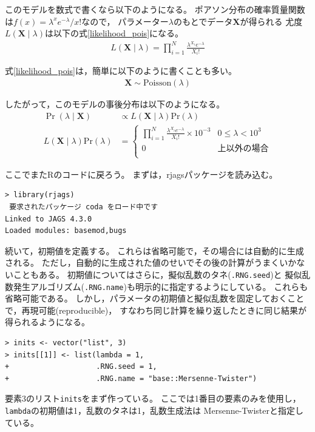 \documentclass[11pt,uplatex]{jsarticle}
\begin{document}
このモデルを数式で書くなら以下のようになる。
ポアソン分布の確率質量関数は$f(x)=\lambda^{x}e^{-\lambda}/x!$なので，
パラメーター$\lambda$のもとでデータ$\bm{X}$が得られる
尤度$L(\bm{X}  \mid  \lambda)$は以下の式\ref{likelihood_pois}になる。
\begin{align}
L(\bm{X} \mid \lambda) = \prod_{i = 1}^{N}\frac{\lambda^{X_{i}}e^{-\lambda}}{X_{i}!}
\label{likelihood_pois}
\end{align}

式\ref{likelihood_pois}は，簡単に以下のように書くことも多い。
\begin{align*}
\bm{X} \sim \mathrm{Poisson}(\lambda)
\end{align*}

したがって，このモデルの事後分布は以下のようになる。
\begin{align*}
\Pr(\lambda \mid \bm{X}) &\propto L(\bm{X} \mid \lambda) \mathrm{Pr}(\lambda) \\
L(\bm{X} \mid \lambda) \mathrm{Pr}(\lambda) &=\begin{cases}
 \prod_{i = 1}^{N}\frac{\lambda^{X_{i}}e^{-\lambda}}{X_{i}!} \times 10^{-3} & 0 \leq \lambda  < 10^{3}  \\
 0 & 上以外の場合  \label{posterior} \\
\end{cases}
\end{align*}

ここでまた\textsf{R}のコードに戻ろう。
まずは，\textsf{rjags}パッケージを読み込む。
\begin{lstlisting}
> library(rjags)
 要求されたパッケージ coda をロード中です 
Linked to JAGS 4.3.0
Loaded modules: basemod,bugs
\end{lstlisting}

続いて，初期値を定義する。
これらは省略可能で，その場合には自動的に生成される。
ただし，自動的に生成された値のせいでその後の計算がうまくいかないこともある。
初期値についてはさらに，擬似乱数のタネ(\texttt{.RNG.seed})と
擬似乱数発生アルゴリズム(\texttt{.RNG.name})も明示的に指定するようにしている。
これらも省略可能である。
しかし，パラメータの初期値と擬似乱数を固定しておくことで，再現可能(reproducible)，
すなわち同じ計算を繰り返したときに同じ結果が得られるようになる。
\begin{lstlisting}
> inits <- vector("list", 3)
> inits[[1]] <- list(lambda = 1,
+                    .RNG.seed = 1,
+                    .RNG.name = "base::Mersenne-Twister")
\end{lstlisting}
%
要素3のリスト\texttt{inits}をまず作っている。
ここでは1番目の要素のみを使用し，
\texttt{lambda}の初期値は1，乱数のタネは1，乱数生成法は Mersenne-Twisterと指定している。
\end{document}
